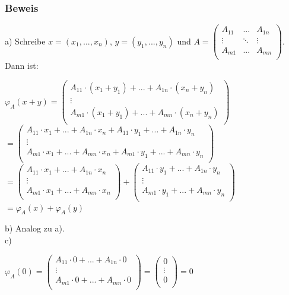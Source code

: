 \documentclass{article}
\begin{document}
\subsubsection*{Beweis}
a) Schreibe $x=(x_1, ..., x_n)$, $y=(y_1, ..., y_n)$ und $A=\begin{pmatrix}
    A_{11} & ... & A_{1n} \\
    \vdots & \ddots & \vdots \\
    A_{m1} & ... & A_{mn} \\
\end{pmatrix}$. \\
Dann ist: \\
\begin{center}
    $\varphi_A(x+y) = \begin{pmatrix}
        A_{11} \cdot (x_1 + y_1) + ... + A_{1n} \cdot (x_n + y_n) \\
        \vdots \\
        A_{m1} \cdot (x_1 + y_1) + ... + A_{mn} \cdot (x_n + y_n) \\
    \end{pmatrix}$ \\
    $= \begin{pmatrix}
        A_{11} \cdot x_1 + ... + A_{1n} \cdot x_n + A_{11} \cdot y_1 + ... + A_{1n} \cdot y_n \\
        \vdots \\
        A_{m1} \cdot x_1 + ... + A_{mn} \cdot x_n + A_{m1} \cdot y_1 + ... + A_{mn} \cdot y_n \\
    \end{pmatrix}$ \\
    $= \begin{pmatrix}
        A_{11} \cdot x_1 + ... + A_{1n} \cdot x_n \\
        \vdots \\
        A_{m1} \cdot x_1 + ... + A_{mn} \cdot x_n \\
    \end{pmatrix} + \begin{pmatrix}
        A_{11} \cdot y_1 + ... + A_{1n} \cdot y_n \\
        \vdots \\
        A_{m1} \cdot y_1 + ... + A_{mn} \cdot y_n \\
    \end{pmatrix}$ \\
    $= \varphi_A(x) + \varphi_A(y)$
\end{center}
b) Analog zu a). \\
c) 
\begin{center}
$\varphi_A(0) = \begin{pmatrix}
    A_{11} \cdot 0 + ... + A_{1n} \cdot 0 \\
    \vdots \\
    A_{m1} \cdot 0 + ... + A_{mn} \cdot 0 \\
\end{pmatrix} = \begin{pmatrix}
    0 \\
    \vdots \\
    0 \\
\end{pmatrix} = 0$ \\
\end{center}
\end{document}
